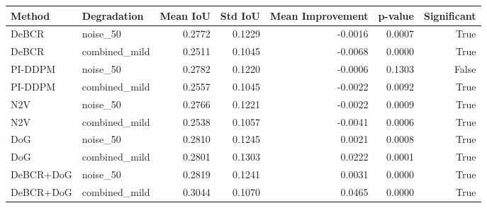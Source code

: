 \begin{tabular}{llrrrrr}
\toprule
Method & Degradation & Mean IoU & Std IoU & Mean Improvement & p-value & Significant \\
\midrule
DeBCR & noise_50 & 0.2772 & 0.1229 & -0.0016 & 0.0007 & True \\
DeBCR & combined_mild & 0.2511 & 0.1045 & -0.0068 & 0.0000 & True \\
PI-DDPM & noise_50 & 0.2782 & 0.1220 & -0.0006 & 0.1303 & False \\
PI-DDPM & combined_mild & 0.2557 & 0.1045 & -0.0022 & 0.0092 & True \\
N2V & noise_50 & 0.2766 & 0.1221 & -0.0022 & 0.0009 & True \\
N2V & combined_mild & 0.2538 & 0.1057 & -0.0041 & 0.0006 & True \\
DoG & noise_50 & 0.2810 & 0.1245 & 0.0021 & 0.0008 & True \\
DoG & combined_mild & 0.2801 & 0.1303 & 0.0222 & 0.0001 & True \\
DeBCR+DoG & noise_50 & 0.2819 & 0.1241 & 0.0031 & 0.0000 & True \\
DeBCR+DoG & combined_mild & 0.3044 & 0.1070 & 0.0465 & 0.0000 & True \\
\bottomrule
\end{tabular}

